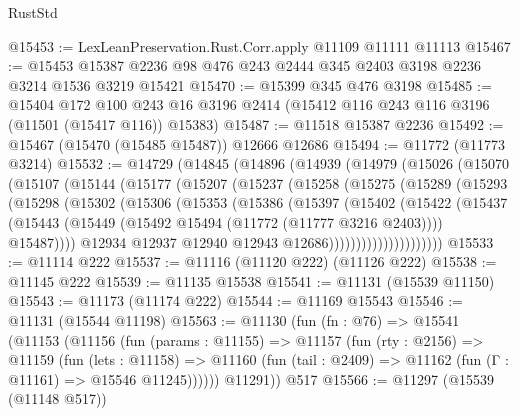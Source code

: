 \begin{lexlean}{RustStd}
\begin{coremodule}
@15453 := LexLeanPreservation.Rust.Corr.apply @11109 @11111 @11113
@15467 := @15453 @15387 @2236 @98 @476 @243 @2444 @345 @2403 @3198 @2236 @3214 @1536 @3219 @15421
@15470 := @15399 @345 @476 @3198
@15485 := @15404
    @172
    @100
    @243
    @16
    @3196
    @2414
    (@15412 @116 @243 @116 @3196 (@11501 (@15417 @116)) @15383)
@15487 := @11518 @15387 @2236
@15492 := @15467 (@15470 (@15485 @15487)) @12666 @12686
@15494 := @11772 (@11773 @3214)
@15532 := @14729
    (@14845
      (@14896
        (@14939
          (@14979
            (@15026
              (@15070
                (@15107
                  (@15144
                    (@15177
                      (@15207
                        (@15237
                          (@15258
                            (@15275
                              (@15289
                                (@15293
                                  (@15298
                                    (@15302
                                      (@15306
                                        (@15353
                                          (@15386
                                            (@15397
                                              (@15402
                                                (@15422
                                                  (@15437
                                                    (@15443
                                                      (@15449
                                                        (@15492
                                                          @15494
                                                          (@11772 (@11777 @3216 @2403))))
                                                      @15487))))
                                              @12934
                                              @12937
                                              @12940
                                              @12943
                                              @12686)))))))))))))))))))))
@15533 := @11114 @222
@15537 := @11116 (@11120 @222) (@11126 @222)
@15538 := @11145 @222
@15539 := @11135 @15538
@15541 := @11131 (@15539 @11150)
@15543 := @11173 (@11174 @222)
@15544 := @11169 @15543
@15546 := @11131 (@15544 @11198)
@15563 := @11130
    (fun (fn : @76) =>
    @15541
      (@11153
        (@11156
          (fun (params : @11155) =>
          @11157
            (fun (rty : @2156) =>
            @11159
              (fun (lets : @11158) =>
              @11160 (fun (tail : @2409) => @11162 (fun (Γ : @11161) => @15546 @11245))))))
        @11291))
    @517
@15566 := @11297 (@15539 (@11148 @517))

\end{coremodule}
\end{lexlean}
